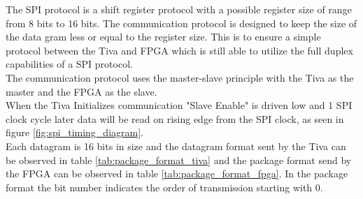 \documentclass[../../../main]{subfiles}
\begin{document}
The SPI protocol is a shift register protocol with a possible register size of range from 8 bits to 16 bits.
The communication protocol is designed to keep the size of the data gram less or equal to the register size. This is to ensure a simple protocol between the Tiva and FPGA which is still able to utilize the full duplex capabilities of a SPI protocol. \\
The communication protocol uses the master-slave principle with the Tiva as the master and the FPGA as the slave.\\
When the Tiva Initializes communication "Slave Enable" is driven low and 1 SPI clock cycle later
data will be read on rising edge from the SPI clock, as seen in figure \ref{fig:spi_timing_diagram}.
\\
Each datagram is 16 bits in size and the datagram format sent by the Tiva
can be observed in table \ref{tab:package_format_tiva} and the package format send by the FPGA
can be observed in table \ref{tab:package_format_fpga}.
In the package format the bit number indicates the order of transmission starting with 0.
\end{document}
